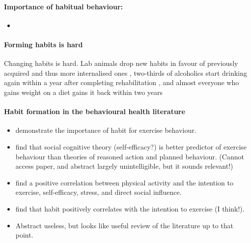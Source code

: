 \documentclass[a4paper, 11pt]{report}
\begin{document}
\paragraph{Importance of habitual behaviour:}
	\begin{itemize}
		\item \citet{bargh1999unbearable}
	\end{itemize}


\paragraph{Forming habits is hard}
Changing habits is hard. Lab animals drop new habits in favour of previously acquired and thus more internalised ones \citep{bouton2004context}, two-thirds of alcoholics start drinking again within a year after completing rehabilitation \citep{kirshenbaum2009quantitative}, and almost everyone who gains weight on a diet gains it back within two years \citep{jeffery2000long}


\paragraph{Habit formation in the behavioural health literature}
\begin{itemize}
	\item \citet{valois1988comparison} demonstrate the importance of habit for exercise behaviour.

	\item \citet{dzewaltowski1990physical} find that social cognitive theory (self-efficacy?) is better predictor of exercise behaviour than theories of reasoned action and planned behaviour. (Cannot access paper, and abstract largely unintelligible, but it sounds relevant!)

	\item \citet{reynolds1990psychosocial} find a positive correlation between physical activity and the intention to exercise, self-efficacy, stress, and direct social influence.

	\item \citet{godin1993pattern} find that habit positively correlates with the intention to exercise (I think!).

	\item \citet{godin1994theories} Abstract useless, but looks like useful review of the literature up to that point.
\end{itemize}
\end{document}
